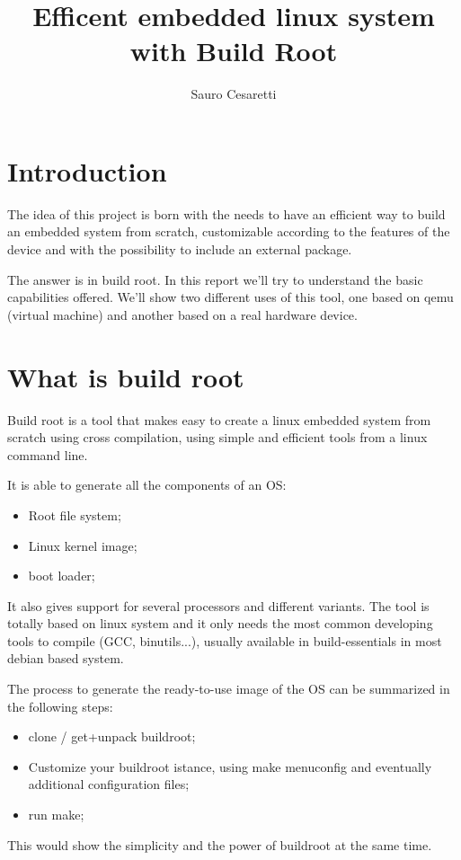 \documentclass[a4paper,twoside,11pt]{article}
\title{Efficent embedded linux system with Build Root}
\author{Sauro Cesaretti}
\begin{document}
\maketitle

\section{Introduction}
The idea of this project is born with the needs to have an efficient way to build an embedded system from scratch, customizable according to the features of the device and with the possibility to include an external package.

The answer is in build root.
In this report we'll try to understand the basic capabilities offered.
We'll show two different uses of this tool, one based on qemu (virtual machine) and another based on a real hardware device.

 
\section{What is build root}
Build root is a tool that makes easy to create a linux embedded system from scratch using cross compilation, using simple and efficient tools from a linux command line.

It is able to generate all the components of an OS:
\begin{itemize}
\item Root file system;
\item Linux kernel image;
\item boot loader;
\end{itemize}

It also gives support for several processors and different variants.
The tool is totally based on linux system and it only needs the most common developing tools to compile (GCC, binutils...), usually available in build-essentials in most debian based system.
 
The process to generate the ready-to-use image of the OS can be summarized in the following steps:
\begin{itemize}
\item clone / get+unpack buildroot;
\item Customize your buildroot istance, using make menuconfig and eventually additional configuration files;
\item run make; 
\end{itemize}
This would show the simplicity and the power of buildroot at the same time.
\end{document}

